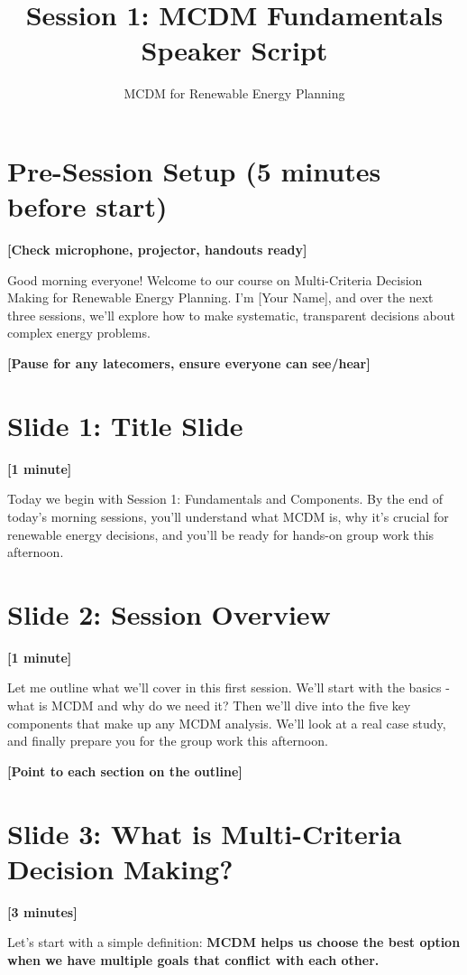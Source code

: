 \documentclass[12pt]{article}
\title{Session 1: MCDM Fundamentals\\Speaker Script}
\author{MCDM for Renewable Energy Planning}
\date{}
\begin{document}
\maketitle

\section*{Pre-Session Setup (5 minutes before start)}
\textcolor{timing}{\textbf{[Check microphone, projector, handouts ready]}}

Good morning everyone! Welcome to our course on Multi-Criteria Decision Making for Renewable Energy Planning. I'm [Your Name], and over the next three sessions, we'll explore how to make systematic, transparent decisions about complex energy problems.

\textcolor{speakernote}{\textbf{[Pause for any latecomers, ensure everyone can see/hear]}}

\section*{Slide 1: Title Slide}
\textcolor{timing}{\textbf{[1 minute]}}

Today we begin with Session 1: Fundamentals and Components. By the end of today's morning sessions, you'll understand what MCDM is, why it's crucial for renewable energy decisions, and you'll be ready for hands-on group work this afternoon.

\section*{Slide 2: Session Overview}
\textcolor{timing}{\textbf{[1 minute]}}

Let me outline what we'll cover in this first session. We'll start with the basics - what is MCDM and why do we need it? Then we'll dive into the five key components that make up any MCDM analysis. We'll look at a real case study, and finally prepare you for the group work this afternoon.

\textcolor{speakernote}{\textbf{[Point to each section on the outline]}}

\section*{Slide 3: What is Multi-Criteria Decision Making?}
\textcolor{timing}{\textbf{[3 minutes]}}

Let's start with a simple definition: \textcolor{emphasis}{\textbf{MCDM helps us choose the best option when we have multiple goals that conflict with each other.}}
\end{document}
